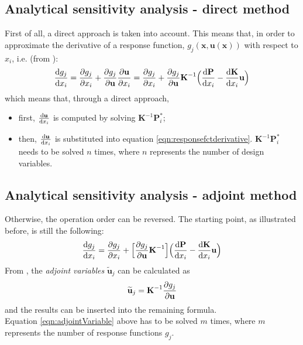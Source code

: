 \subsection{Analytical sensitivity analysis - direct method}
First of all, a direct approach is taken into account. This means that, in order to approximate the derivative of a response function, $g_j(\textbf{x}, \textbf{u}(\textbf{x}))$ with respect to $x_i$, i.e. (from \cite{optimization_Bletzinger}):
\begin{equation} \label{eqn:responsefctderivative}
\dv{g_j}{x_i} = \pdv{g_j}{x_i} + \pdv{g_j}{\textbf{u}} \pdv{\textbf{u}}{x_i} = \pdv{g_j}{x_i} + \pdv{g_j}{\textbf{u}} \textbf{K}^{-1} \Big(\dv{\textbf{P}}{x_i} - \dv{\textbf{K}}{x_i}\textbf{u}\Big)
\end{equation}
which means that, through a direct approach, 
\begin {itemize}
\item first, $\dv{\textbf{u}}{x_i}$ is computed by solving $\textbf{K}^{-1}\textbf{P}_i^{\ast}$;
\item then, $\dv{\textbf{u}}{x_i}$ is substituted into equation \ref{eqn:responsefctderivative}. $\textbf{K}^{-1}\textbf{P}_i^{\ast}$ needs to be solved $n$ times, where $n$ represents the number of design variables.
\end{itemize}

\subsection{Analytical sensitivity analysis - adjoint method}
Otherwise, the operation order can be reversed. The starting point, as illustrated before, is still the following: 
\begin{equation}
\dv{g_j}{x_i} = \pdv{g_j}{x_i} + \Big[\pdv{g_j}{\textbf{u}}\textbf{K}^{-1}\Big] \Big(\dv{\textbf{P}}{x_i} - \dv{\textbf{K}}{x_i}\textbf{u}\Big)
\end{equation}
From \cite{optimization_Bletzinger}, the \textit{adjoint variables} $\widetilde{\textbf{u}}_j$ can be calculated as 
\begin{equation} \label{eqn:adjointVariable}
\widetilde{\textbf{u}}_j = \textbf{K}^{-1} \pdv{g_j}{\textbf{u}}
\end{equation}
and the results can be inserted into the remaining formula. \\[3pt]
Equation \ref{eqn:adjointVariable} above has to be solved $m$ times, where $m$ represents the number of response functions $g_j$.


